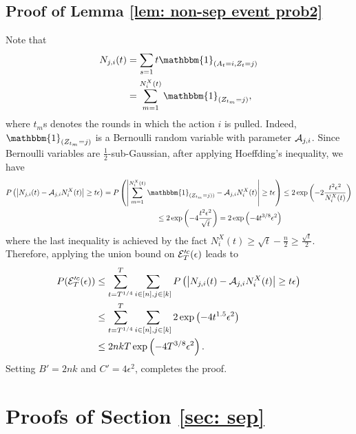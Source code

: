      \subsection{Proof of Lemma \ref{lem: non-sep event prob2}} \label{apd: proof-non-sep event prob2}
        Note that
        \begin{align*}
            N_{j,i}(t) &= \sum_{s = 1}{t} \mathbbm{1}_{(A_t = i, Z_t = j)} \\
                       &= \sum_{m = 1}^{N^{X}_{i}(t)} \mathbbm{1}_{(Z_{t_{m}} = j)},
       \end{align*}
       where $t_m$s denotes the rounds in which the action $i$ is pulled. Indeed, $\mathbbm{1}_{(Z_{t_{m}} = j)}$ is a Bernoulli random variable with parameter $\mathcal{A}_{j,i}$. Since Bernoulli variables are $\frac{1}{2}$-sub-Gaussian, after applying Hoeffding's inequality, we have
        \begin{align*}
            \pr\left ( \left \vert N_{j,i}(t) - \A_{j,i} N^{X}_{i}(t)\right \vert \geq t \epsilon \right) 
            =  \pr\left ( \left \vert \sum_{m = 1}^{N^{X}_{i}(t)} \mathbbm{1}_{(Z_{t_{m}} = j))} - \A_{j,i} N^{X}_{i}(t)\right \vert \geq t \epsilon \right ) &\leq 2 \exp \left (-2\frac{t^2\epsilon^2}{N^{X}_{i}(t)} \right ) \\
            \leq 2 \exp \left (-4\frac{t^2\epsilon^2}{\sqrt{t}} \right ) = 2 \exp \left (-4t^{3/8}\epsilon^2 \right ) 
        \end{align*}
        where the last inequality is achieved by the fact $N^{X}_{i}(t) \geq \sqrt{t} - \frac{n}{2} \geq \frac{\sqrt{t}}{2}$.
       Therefore, applying the union bound on $\mathcal{E}'^c_T(\epsilon)$ leads to
       \begin{align*}
             P(\mathcal{E}'^c_T(\epsilon)) &\leq \sum_{t = T^{1/ 4}}^T \sum_{i \in [n], j \in [k]}        P\left ( \left \vert N_{j,i}(t) - \mathcal{A}_{j,i} N^{X}_{i}(t)\right \vert \geq t \epsilon \right) \\ 
                            &\leq \sum_{t = T^{1/ 4}}^T \sum_{i \in [n], j \in [k]} 2 \exp \left (-4 t^{1.5}\epsilon^2 \right ) \\
                            &\leq 2nkT \exp \left (-4 T^{3/8}\epsilon^2 \right ).
       \end{align*} 
       Setting $B' = 2nk$ and $C' = 4\epsilon^2$, completes the proof.
    
        
\section{Proofs of Section \ref{sec: sep}} \label{apd: sep proofs}

